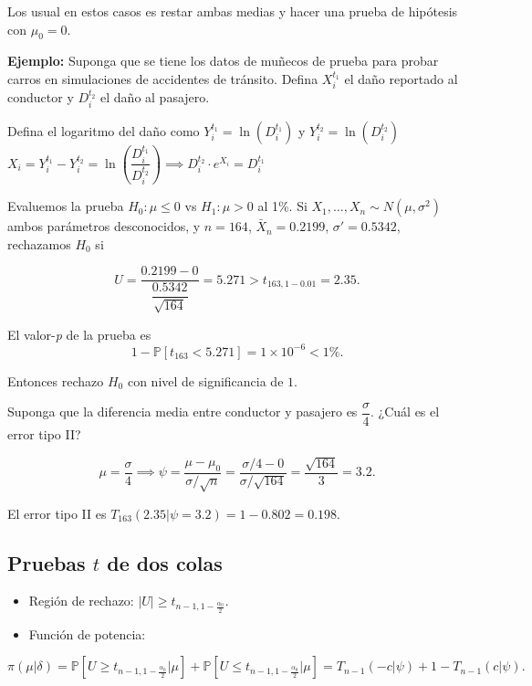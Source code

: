 \documentclass[
  12pt,
]{book}
\begin{document}
Los usual en estos casos es restar ambas medias y hacer una prueba de hipótesis
con \(\mu_0 = 0\).

\textbf{Ejemplo:} Suponga que se tiene los datos de muñecos de prueba para probar
carros en simulaciones de accidentes de tránsito. Defina \(X_i ^{t_1}\) el daño
reportado al conductor y \(D_i ^{t_2}\) el daño al pasajero.

Defina el logaritmo del daño como \(Y_i ^{t_1} = \ln(D_{i}^{t_1})\) y \(Y_i ^{t_2} = \ln(D_{i}^{t_2})\)
\(X_i = Y_i^{t_1}-Y_i^{t_2} = \ln\left(\dfrac{D_{i}^{t_1}}{D_{i}^{t_2}}\right) \implies D_{i}^{t_2}\cdot e^{X_i} = D_{i}^{t_1}\)

Evaluemos la prueba \(H_0:\mu\leq 0\) vs \(H_1:\mu>0\) al 1\%. Si \(X_1,\dots, X_n \sim N(\mu,\sigma^2)\) ambos parámetros desconocidos, y \(n=164\), \(\bar X_n = 0.2199\), \(\sigma'=0.5342\), rechazamos \(H_0\) si

\[
U = \dfrac{0.2199-0}{\dfrac{0.5342}{\sqrt {164}}} = 5.271 >t_{163,1-0.01} = 2.35.
\]

El valor-\emph{p} de la prueba es
\[
1-\mathbb P[t_{163}<5.271] = 1\times10^{-6}<1\%.
\]

Entonces rechazo \(H_0\) con nivel de significancia de \(1%
\).

Suponga que la diferencia media entre conductor y pasajero es \(\dfrac\sigma 4\).
¿Cuál es el error tipo II?

\[
\mu =\dfrac\sigma 4\implies \psi = \dfrac{\mu-\mu_0}{\sigma/\sqrt n} = \dfrac{\sigma/4-0}{\sigma/\sqrt{164}} = \dfrac{\sqrt{164}}{3} = 3.2.
\]

El error tipo II es \(T_{163}(2.35|\psi =3.2) = 1-0.802 = 0.198\).

\hypertarget{pruebas-t-de-dos-colas}{%
\subsection{\texorpdfstring{Pruebas \(t\) de dos colas}{Pruebas t de dos colas}}\label{pruebas-t-de-dos-colas}}

\begin{itemize}
\item
  Región de rechazo: \(|U|\geq t_{n-1,1-\frac{\alpha_0}2}\).
\item
  Función de potencia:
\end{itemize}

\[
\pi(\mu|\delta) = \mathbb P[U\geq t_{n-1,1-\frac{\alpha_0}2}|\mu]+\mathbb P[U\leq t_{n-1,1-\frac{\alpha_0}2}|\mu] = T_{n-1}(-c|\psi) + 1-T_{n-1}(c|\psi).
\]
\end{document}
